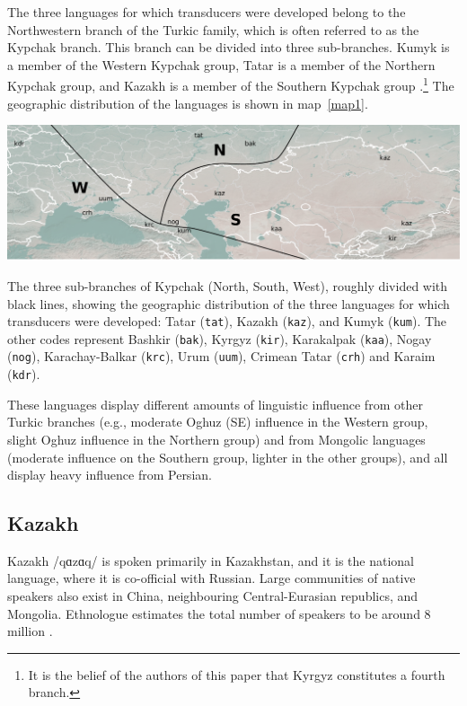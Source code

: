 \documentclass[a4paper,11pt,twocolumn]{article}
\begin{document}
The three languages for which transducers were developed belong to the Northwestern branch of the Turkic family, which is often referred to as the Kypchak branch.  This branch can be divided into three sub-branches.  Kumyk is a member of the Western Kypchak group, Tatar is a member of the Northern Kypchak group, and Kazakh is a member of the Southern Kypchak group \citep[82-83]{histofturkic}.\footnote{It is the belief of the authors of this paper that Kyrgyz constitutes a fourth branch.}   The geographic distribution of the languages is shown in map~\ref{map1}.

\begin{map*}[htbp]
	\includegraphics[width=\textwidth]{map/map}
	\caption{The three sub-branches of Kypchak (North, South, West), roughly divided with black lines, showing the geographic distribution of the three languages for which transducers were developed: Tatar (\texttt{tat}), Kazakh (\texttt{kaz}), and Kumyk (\texttt{kum}). The other codes represent Bashkir (\texttt{bak}), Kyrgyz (\texttt{kir}), Karakalpak (\texttt{kaa}), Nogay (\texttt{nog}), Karachay-Balkar (\texttt{krc}), Urum (\texttt{uum}), Crimean Tatar (\texttt{crh}) and Karaim (\texttt{kdr}).}
	\label{map1}
\end{map*}

These languages display different amounts of linguistic influence from other Turkic branches (e.g., moderate Oghuz (SE) influence in the Western group, slight Oghuz influence in the Northern group) and from Mongolic languages (moderate influence on the Southern group, lighter in the other groups), and all display heavy influence from Persian.

\subsection{Kazakh}
Kazakh /q{\symbl ɑ}z{\symbl ɑ}q/ is spoken primarily in Kazakhstan, and it is the national language, where it is co-official with Russian.  Large communities of native speakers also exist in China, neighbouring Central-Eurasian republics, and Mongolia. Ethnologue estimates
the total number of speakers to be around 8 million \citep{ethnologue}.
\end{document}
